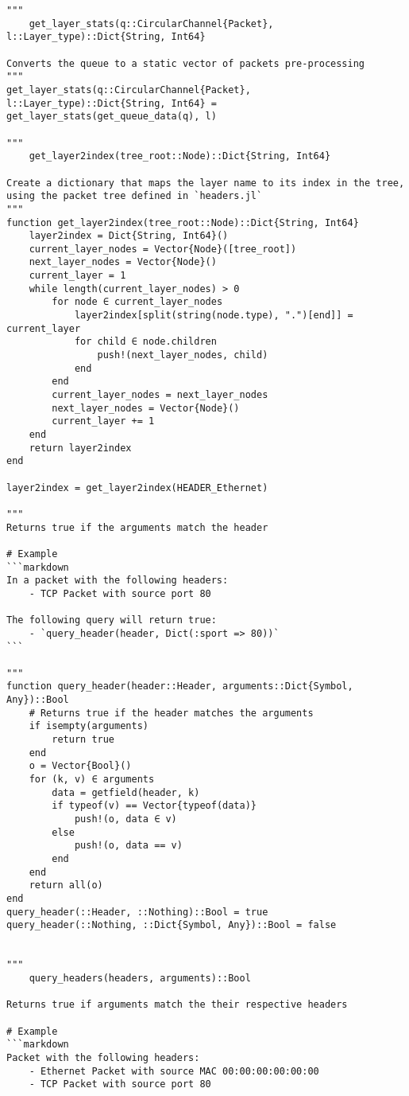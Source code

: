 \begin{lstlisting}[language=JuliaLocal, style=julia]
"""
    get_layer_stats(q::CircularChannel{Packet}, l::Layer_type)::Dict{String, Int64}

Converts the queue to a static vector of packets pre-processing
"""
get_layer_stats(q::CircularChannel{Packet}, l::Layer_type)::Dict{String, Int64} = get_layer_stats(get_queue_data(q), l)

"""
    get_layer2index(tree_root::Node)::Dict{String, Int64}

Create a dictionary that maps the layer name to its index in the tree, using the packet tree defined in `headers.jl`
"""
function get_layer2index(tree_root::Node)::Dict{String, Int64}
    layer2index = Dict{String, Int64}()
    current_layer_nodes = Vector{Node}([tree_root])
    next_layer_nodes = Vector{Node}()
    current_layer = 1
    while length(current_layer_nodes) > 0
        for node ∈ current_layer_nodes
            layer2index[split(string(node.type), ".")[end]] = current_layer
            for child ∈ node.children
                push!(next_layer_nodes, child)
            end
        end
        current_layer_nodes = next_layer_nodes
        next_layer_nodes = Vector{Node}()
        current_layer += 1
    end
    return layer2index
end

layer2index = get_layer2index(HEADER_Ethernet)

"""
Returns true if the arguments match the header

# Example
```markdown
In a packet with the following headers:
    - TCP Packet with source port 80

The following query will return true:
    - `query_header(header, Dict(:sport => 80))`
```

"""
function query_header(header::Header, arguments::Dict{Symbol, Any})::Bool
    # Returns true if the header matches the arguments
    if isempty(arguments)
        return true
    end
    o = Vector{Bool}()
    for (k, v) ∈ arguments
        data = getfield(header, k)
        if typeof(v) == Vector{typeof(data)}
            push!(o, data ∈ v)
        else
            push!(o, data == v)
        end
    end
    return all(o)
end
query_header(::Header, ::Nothing)::Bool = true
query_header(::Nothing, ::Dict{Symbol, Any})::Bool = false


"""
    query_headers(headers, arguments)::Bool

Returns true if arguments match the their respective headers

# Example
```markdown
Packet with the following headers:
    - Ethernet Packet with source MAC 00:00:00:00:00:00
    - TCP Packet with source port 80


\end{lstlisting}
